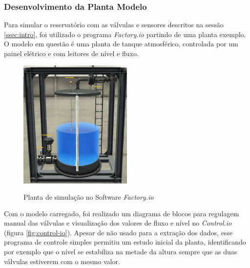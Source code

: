 \documentclass[
	article,			%
	11pt,				%
	oneside,			%
	a4paper,			%
	section=TITLE,		%
	english,			%
	brazil,				%
	sumario=tradicional
	]{abntex2}
\newcommand{\factorio}{\textit{Factory.io}}%
\begin{document}
    

\subsubsection{Desenvolvimento da Planta Modelo}

Para simular o reservatório com as válvulas e sensores descritos na sessão \ref{ssec:intro}, foi utilizado o programa \factorio {} partindo de uma planta exemplo. O modelo em questão é uma planta de tanque atmosférico, controlada por um painel elétrico e com leitores de nível e fluxo.
 
\begin{figure}[H]
    \centering
    \caption{Planta de simulação no Software \factorio{}}
    \includegraphics[width=0.5\textwidth]{img/factory IO.PNG}
    \label{fig:planta-factory-io}
\end{figure}
    
Com o modelo carregado, foi realizado um diagrama de blocos para regulagem manual das válvulas e visualização dos valores de fluxo e nível no \textit{Control.io} (figura \ref{fig:control-io}). Apesar de não usado para a extração dos dados, esse programa de controle simples permitiu um estudo inicial da planta, identificando por exemplo que o nível se estabiliza na metade da altura sempre que as duas válvulas estiverem com o mesmo valor.
\end{document}
